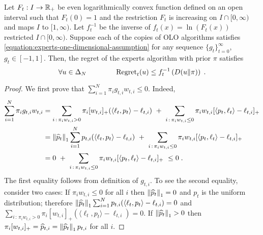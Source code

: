 \begin{theorem}
Let $F_t:I \to \mathbb{R}_+$ be even logarithmically convex function defined
on an open interval such that $F_t(0) = 1$ and the restriction $F_t$
is increasing on $I \cap [0,\infty)$ and maps $I$ to $[1, \infty)$.
Let $f_t^{-1}$ be the inverse of $f_t(x) = \ln \left(F_t(x)\right)$
restricted $I \cap [0,\infty)$.
Suppose each of the copies of OLO algorithms satisfies
\eqref{equation:experts-one-dimensional-assumption}
for any sequence $\{g_t\}_{t=0}^\infty$, $g_t \in [-1,1]$. Then, the regret
of the experts algorithm with prior $\pi$ satisfies
$$
\forall u \in \Delta_N \qquad \qquad
\operatorname{Regret}_t(u) \le f_t^{-1}\left( D({u}\|{\pi}) \right) \; .
$$
\end{theorem}

\begin{proof}
We first prove that $\sum_{i=1}^N \pi_i g_{t,i} w_{t,i} \le 0$. Indeed,
\begin{align*}
\sum_{i=1}^N \pi_i g_{t,i} w_{t,i}
& = \sum_{i \, : \, \pi_i w_{t,i} > 0} \pi_i [w_{t,i}]_+ (\langle \ell_t, p_t \rangle - \ell_{t,i})  \ + \ \sum_{i \, : \, \pi_i w_{t,i} \le 0} \pi_i w_{t,i} [\langle p_t, \ell_t\rangle - \ell_{t,i}]_+ \\
& = \left\|{\widehat p_t}\right\|_1 \sum_{i=1}^N p_{t,i} (\langle \ell_t, p_t \rangle - \ell_{t,i})  \ + \ \sum_{i \, : \, \pi_i w_{t,i} \le 0} \pi_i w_{t,i} [\langle p_t, \ell_t\rangle - \ell_{t,i}]_+ \\
& = 0 \ + \ \sum_{i \, : \, \pi_i w_{t,i} \le 0} \pi_i w_{t,i} [\langle p_t, \ell_t\rangle - \ell_{t,i}]_+
\ \le 0 \; .
\end{align*}
The first equality follows from definition of $g_{t,i}$. To see the second equality,
consider two cases: If $\pi_i w_{t,i} \le 0$ for all $i$ then $\left\|{\widehat p_t}\right\|_1 = 0$ and $p_t$ is the uniform distribution;
therefore $\left\|{\widehat p_t}\right\|_1 \sum_{i=1}^N p_{t,i} (\langle \ell_t, p_t \rangle - \ell_{t,i}) = 0$ and
$\sum_{i \, : \, \pi_i w_{t,i} > 0} \pi_i [w_{t,i}]_+ (\langle \ell_t, p_t \rangle - \ell_{t,i}) = 0$.
If $\left\|{\widehat p_t}\right\|_1 > 0$ then $\pi_i [w_{t,i}]_+ = \widehat p_{t,i} = \left\|{\widehat p_t}\right\|_1 p_{t,i}$ for all $i$.


\end{proof}
